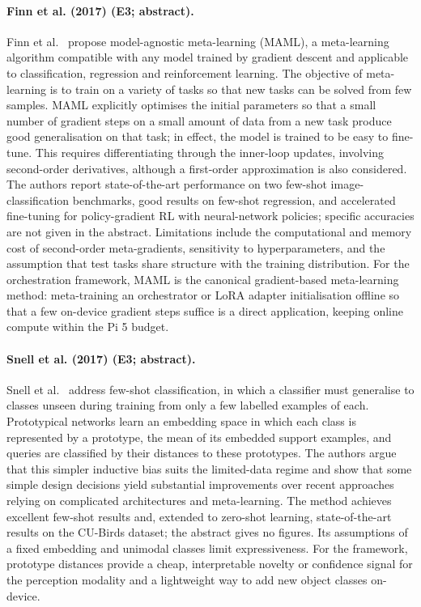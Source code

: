 \documentclass[10pt,a4paper]{article}
\begin{document}
\paragraph{Finn et al. (2017) (E3; abstract).} Finn et al.~\cite{Finn2017} propose model-agnostic meta-learning (MAML), a meta-learning algorithm compatible with any model trained by gradient descent and applicable to classification, regression and reinforcement learning. The objective of meta-learning is to train on a variety of tasks so that new tasks can be solved from few samples. MAML explicitly optimises the initial parameters so that a small number of gradient steps on a small amount of data from a new task produce good generalisation on that task; in effect, the model is trained to be easy to fine-tune. This requires differentiating through the inner-loop updates, involving second-order derivatives, although a first-order approximation is also considered. The authors report state-of-the-art performance on two few-shot image-classification benchmarks, good results on few-shot regression, and accelerated fine-tuning for policy-gradient RL with neural-network policies; specific accuracies are not given in the abstract. Limitations include the computational and memory cost of second-order meta-gradients, sensitivity to hyperparameters, and the assumption that test tasks share structure with the training distribution. For the orchestration framework, MAML is the canonical gradient-based meta-learning method: meta-training an orchestrator or LoRA adapter initialisation offline so that a few on-device gradient steps suffice is a direct application, keeping online compute within the Pi 5 budget.

\paragraph{Snell et al. (2017) (E3; abstract).} Snell et al.~\cite{Snell2017} address few-shot classification, in which a classifier must generalise to classes unseen during training from only a few labelled examples of each. Prototypical networks learn an embedding space in which each class is represented by a prototype, the mean of its embedded support examples, and queries are classified by their distances to these prototypes. The authors argue that this simpler inductive bias suits the limited-data regime and show that some simple design decisions yield substantial improvements over recent approaches relying on complicated architectures and meta-learning. The method achieves excellent few-shot results and, extended to zero-shot learning, state-of-the-art results on the CU-Birds dataset; the abstract gives no figures. Its assumptions of a fixed embedding and unimodal classes limit expressiveness. For the framework, prototype distances provide a cheap, interpretable novelty or confidence signal for the perception modality and a lightweight way to add new object classes on-device.
\end{document}

